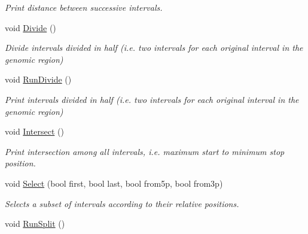\begin{DoxyCompactItemize}
\begin{DoxyCompactList}\small\item\em Print distance between successive intervals. \end{DoxyCompactList}\item 
\hypertarget{classGenomicRegionGFF_a77975c03dd39b404098eb519e81f67d4}{
void \hyperlink{classGenomicRegionGFF_a77975c03dd39b404098eb519e81f67d4}{Divide} ()}
\label{classGenomicRegionGFF_a77975c03dd39b404098eb519e81f67d4}

\begin{DoxyCompactList}\small\item\em Divide intervals divided in half (i.e. two intervals for each original interval in the genomic region) \end{DoxyCompactList}\item 
\hypertarget{classGenomicRegionGFF_ad4acc1231677efd876084ef36db82de1}{
void \hyperlink{classGenomicRegionGFF_ad4acc1231677efd876084ef36db82de1}{RunDivide} ()}
\label{classGenomicRegionGFF_ad4acc1231677efd876084ef36db82de1}

\begin{DoxyCompactList}\small\item\em Print intervals divided in half (i.e. two intervals for each original interval in the genomic region) \end{DoxyCompactList}\item 
\hypertarget{classGenomicRegionGFF_ad35d9b6e9c57270c0d5648ae9f702959}{
void \hyperlink{classGenomicRegionGFF_ad35d9b6e9c57270c0d5648ae9f702959}{Intersect} ()}
\label{classGenomicRegionGFF_ad35d9b6e9c57270c0d5648ae9f702959}

\begin{DoxyCompactList}\small\item\em Print intersection among all intervals, i.e. maximum start to minimum stop position. \end{DoxyCompactList}\item 
\hypertarget{classGenomicRegionGFF_aaa9b1271561e2d62ef1be6464e589cf4}{
void \hyperlink{classGenomicRegionGFF_aaa9b1271561e2d62ef1be6464e589cf4}{Select} (bool first, bool last, bool from5p, bool from3p)}
\label{classGenomicRegionGFF_aaa9b1271561e2d62ef1be6464e589cf4}

\begin{DoxyCompactList}\small\item\em Selects a subset of intervals according to their relative positions. \end{DoxyCompactList}\item 
\hypertarget{classGenomicRegionGFF_abc08552b0ad4ca512f79064b8cd64e54}{
void \hyperlink{classGenomicRegionGFF_abc08552b0ad4ca512f79064b8cd64e54}{RunSplit} ()}
\label{classGenomicRegionGFF_abc08552b0ad4ca512f79064b8cd64e54}


\end{DoxyCompactItemize}
